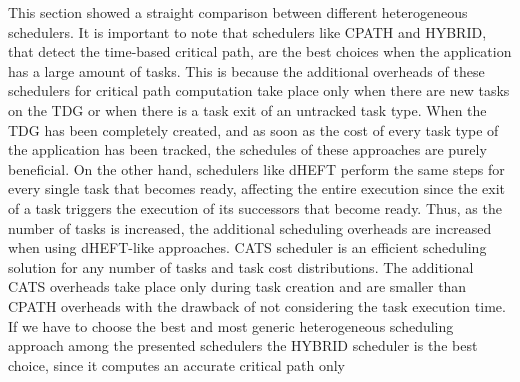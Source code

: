 This section showed a straight comparison between different heterogeneous schedulers.
It is important to note that schedulers like CPATH and HYBRID, that detect the time-based critical path, are the best choices when the application has a large amount of tasks.
This is because the additional overheads of these schedulers for critical path computation take place only when there are new tasks on the TDG or when there is a task exit of an untracked task type. 
When the TDG has been completely created, and as soon as the cost of every task type of the application has been tracked, the schedules of these approaches are purely beneficial.
On the other hand, schedulers like dHEFT perform the same steps for every single task that becomes ready, affecting the entire execution since the exit of a task triggers the execution of its successors that become ready. 
Thus, as the number of tasks is increased, the additional scheduling overheads are increased when using dHEFT-like approaches.
CATS scheduler is an efficient scheduling solution for any number of tasks and task cost distributions.
The additional CATS overheads take place only during task creation and are smaller than CPATH overheads with the drawback of not considering the task execution time.
If we have to choose the best and most generic heterogeneous scheduling approach among the presented schedulers the HYBRID scheduler is the best choice, since it computes an accurate critical path only

